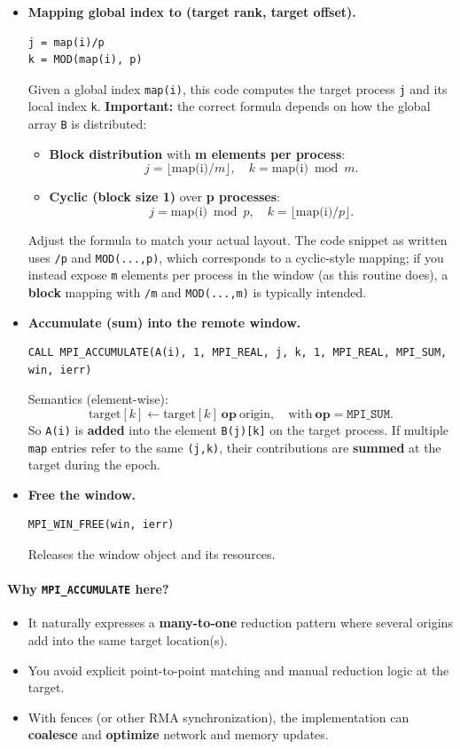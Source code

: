 \documentclass[12pt]{book}
\begin{document}
\begin{itemize}
    \item \textbf{Mapping global index to (target rank, target offset).}
\begin{lstlisting}[style=cppstyle]
j = map(i)/p
k = MOD(map(i), p)
\end{lstlisting}
Given a global index \texttt{map(i)}, this code computes the target process \texttt{j} and its local index \texttt{k}. 
\textbf{Important:} the correct formula depends on how the global array \texttt{B} is distributed:
\begin{itemize}
    \item \textbf{Block distribution} with \textbf{m elements per process}:
    \[
    j = \lfloor \text{map(i)} / m \rfloor,\quad k = \text{map(i)} \bmod m.
    \]
    \item \textbf{Cyclic (block size 1)} over \textbf{p processes}:
    \[
    j = \text{map(i)} \bmod p,\quad k = \lfloor \text{map(i)} / p \rfloor.
    \]
\end{itemize}
Adjust the formula to match your actual layout. The code snippet as written uses \texttt{/p} and \texttt{MOD(...,p)}, which corresponds to a cyclic-style mapping; if you instead expose \texttt{m} elements per process in the window (as this routine does), a \textbf{block} mapping with \texttt{/m} and \texttt{MOD(...,m)} is typically intended.

    \item \textbf{Accumulate (sum) into the remote window.}
\begin{lstlisting}[style=cppstyle]
CALL MPI_ACCUMULATE(A(i), 1, MPI_REAL, j, k, 1, MPI_REAL, MPI_SUM, win, ierr)
\end{lstlisting}
Semantics (element-wise):
\[
\text{target}[k] \leftarrow \text{target}[k]\ \mathbf{op}\ \text{origin},
\quad \text{with}\ \mathbf{op} = \texttt{MPI\_SUM}.
\]
So \texttt{A(i)} is \textbf{added} into the element \texttt{B(j)[k]} on the target process. If multiple \texttt{map} entries refer to the same \texttt{(j,k)}, their contributions are \textbf{summed} at the target during the epoch.

    \item \textbf{Free the window.}
\begin{lstlisting}[style=cppstyle]
MPI_WIN_FREE(win, ierr)
\end{lstlisting}
Releases the window object and its resources.
\end{itemize}

\paragraph{Why \texttt{MPI\_ACCUMULATE} here?}
\begin{itemize}
    \item It naturally expresses a \textbf{many-to-one} reduction pattern where several origins add into the same target location(s).
    \item You avoid explicit point-to-point matching and manual reduction logic at the target.
    \item With fences (or other RMA synchronization), the implementation can \textbf{coalesce} and \textbf{optimize} network and memory updates.
\end{itemize}
\end{document}

